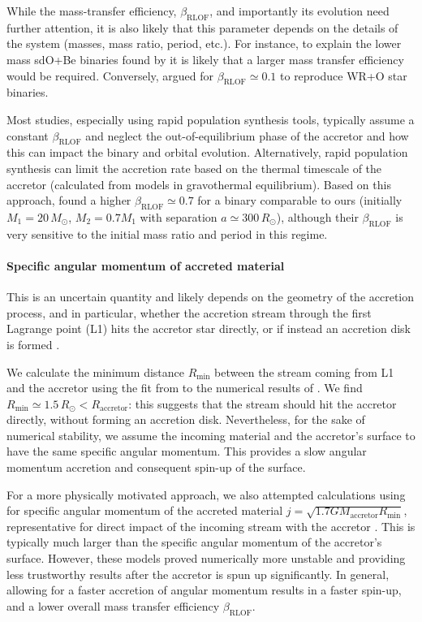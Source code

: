 \documentclass[twocolumn,twocolappendix,trackchanges]{aastex63}
\begin{document}
While the mass-transfer efficiency, $\beta_\mathrm{RLOF}$, and
importantly its evolution need further attention, it is also
likely that this parameter depends on the details of
the system (masses, mass ratio, period, etc.). For instance, to
explain the lower mass sdO+Be binaries found by \cite{wang:21_sdOBe}
it is likely that a larger mass transfer efficiency would be
required. Conversely, \cite{petrovic:05} argued for
$\beta_\mathrm{RLOF}\simeq 0.1$ to reproduce WR+O star binaries.


Most studies, especially using rapid population synthesis tools,
typically assume a constant $\beta_\mathrm{RLOF}$ and neglect the
out-of-equilibrium phase of the accretor and how this can impact the
binary and orbital evolution. Alternatively, rapid population
synthesis can limit the accretion rate based on the thermal timescale
of the accretor (calculated from models in gravothermal
equilibrium). Based on this approach, \cite{schneider:15} found a
higher $\beta_\mathrm{RLOF}\simeq 0.7$ for a binary comparable to ours
(initially $M_1=20\,M_\odot$, $M_2=0.7M_1$ with separation
$a\simeq300\,R_\odot$), although their $\beta_\mathrm{RLOF}$ is very
sensitive to the initial mass ratio and period in this regime.

\paragraph{Specific angular momentum of accreted material}
This is an uncertain quantity and likely depends on the geometry of
the accretion process, and in particular, whether the accretion stream
through the first Lagrange point (L1) hits the accretor star directly,
or if instead an accretion disk is formed \citep[e.g.,][]{demink:13}.

We calculate the minimum distance $R_\mathrm{min}$ between the stream
coming from L1 and the accretor using the fit from \cite{ulrich:76} to
the numerical results of \cite{lubow:75}. We find
$R_\mathrm{min}\simeq 1.5\,R_\odot < R_\mathrm{accretor}$: this
suggests that the stream should hit the accretor directly, without
forming an accretion disk. Nevertheless, for the sake of numerical
stability, we assume the incoming material and the accretor's surface to
have the same specific angular momentum. This provides a slow angular
momentum accretion and consequent spin-up of the surface.

For a more physically motivated approach, we also attempted
calculations using for specific angular momentum of the accreted
material $j=\sqrt{1.7GM_\mathrm{accretor}R_\mathrm{min}}$,
representative for direct impact of the incoming stream with the
accretor \citep{lubow:75}. This is typically much larger than the
specific angular momentum of the accretor's surface. However, these
models proved numerically more unstable and providing less trustworthy
results after the accretor is spun up significantly. In general,
allowing for a faster accretion of angular momentum results in a
faster spin-up, and a lower overall mass transfer efficiency
$\beta_\mathrm{RLOF}$.
\end{document}
